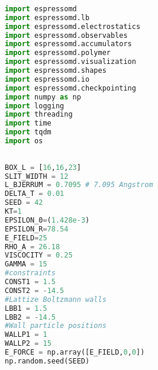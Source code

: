 \begin{lstlisting}[language=python]
	
import espressomd
import espressomd.lb
import espressomd.electrostatics
import espressomd.observables
import espressomd.accumulators
import espressomd.polymer
import espressomd.visualization
import espressomd.shapes
import espressomd.io
import espressomd.checkpointing
import numpy as np
import logging
import threading
import time
import tqdm
import os
	
	
BOX_L = [16,16,23]
SLIT_WIDTH = 12
L_BJERRUM = 0.7095 # 7.095 Angstrom
DELTA_T = 0.01
SEED = 42
KT=1
EPSILON_0=(1.428e-3)
EPSILON_R=78.54
E_FIELD=25
RHO_A = 26.18
VISCOCITY = 0.25
GAMMA = 15
#constraints
CONST1 = 1.5
CONST2 = -14.5
#Lattize Boltzmann walls
LBB1 = 1.5
LBB2 = -14.5
#Wall particle positions
WALLP1 = 1
WALLP2 = 15
E_FORCE = np.array([E_FIELD,0,0])
np.random.seed(SEED)


\end{lstlisting}

